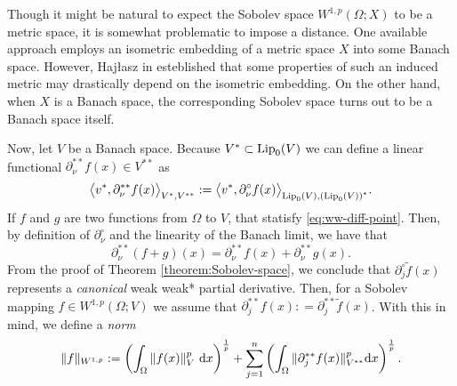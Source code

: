 \documentclass[reqno]{amsart}
\begin{document}
Though it might be natural to expect the Sobolev space $W^{1,p}(\Omega; X)$ to be a metric space, it is somewhat problematic to impose a distance.
 One available approach employs an isometric embedding of a metric space $X$ into some Banach space. 
 However, Haj{\l}asz in \cite{H2011} esteblished that some properties of such an induced metric may drastically depend on the isometric embedding.
 On the other hand, when $X$ is a Banach space, the corresponding Sobolev space turns out to be a Banach space itself.

Now, let $V$ be a Banach space. Because $V^*\subset \textnormal{Lip}_{0}(V)$ we can define a linear functional $\partial^{**}_{\nu}f(x)\in V^{**}$
as
\[
\big\langle v^*, \partial^{**}_\nu f(x)\big\rangle_{V^*,V^{**}} 
:= \big\langle v^*, \partial^\circ_\nu f(x) \big\rangle_{\textnormal{Lip}_{0}(V), \left(\textnormal{Lip}_{0}(V)\right)^*}.
\]
If $f$ and $g$ are two functions from $\Omega$ to $V$, that statisfy \eqref{eq:ww-diff-point}. Then, by definition of $\partial^\circ_\nu$ and the linearity of the Banach limit, we have that
\[
\partial^{**}_\nu(f +g )(x) = \partial^{**}_\nu f (x) + \partial^{**}_\nu g(x).
\]
From the proof of Theorem \ref{theorem:Sobolev-space}, we conclude that $\partial^\circ_j \widetilde{f}(x)$ represents a \textit{canonical} weak weak* partial derivative.
Then, for a Sobolev mapping $f\in W^{1,p}(\Omega; V)$ we assume that $\partial^{**}_j f(x): =\partial^{**}_j \widetilde{f}(x)$.
With this in mind, we define a \textit{norm}
\[
   \|f\|_{W^{1,p}}:=\left(\int_\Omega \|f(x)\|_{V}^{p}\ \textnormal{d}x\right)^{\frac{1}{p}} + 
   \sum_{j=1}^n \left(\int_\Omega \|\partial^{**}_j f(x) \|^p_{V^{**}} \textnormal{d}x\right)^{\frac{1}{p}}.
\]
\end{document}
